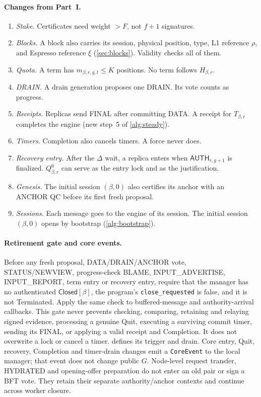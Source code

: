 \documentclass[11pt,a4paper]{article}
\newcommand{\tagg}[1]{\ensuremath{\mathsf{#1}}}
\begin{document}
\paragraph{Changes from Part~I.}
\begin{enumerate}[label=\arabic*.]
\item \emph{Stake.} Certificates need weight $>F$, not $f+1$ signatures.
\item \emph{Blocks.} A block also carries its session, physical
position, type, L1 reference $\rho$, and Espresso reference $\xi$
(\cref{sec:blocks}). Validity
checks all of them.
\item \emph{Quota.} A term has $m_{\beta,r,g,t}\le K$ positions. No term follows
$H_{\beta,r}$.
\item \emph{DRAIN.} A drain generation proposes one DRAIN. Its vote
counts as progress.
\item \emph{Receipts.} Replicas send FINAL after committing DATA. A
receipt for $T_{\beta,r}$ completes the engine (new step~5 of \cref{alg:steady}).
\item \emph{Timers.} Completion also cancels timers. A force never does.
\item \emph{Recovery entry.} After the $\Delta$ wait, a replica enters
when $\tagg{AUTH}_{r,g+1}$ is finalized. $Q_{\beta,r}^0$ can serve as the entry
lock and as the justification.
\item \emph{Genesis.} The initial session $(\beta,0)$ also certifies its anchor with an
ANCHOR QC before its first fresh proposal.
\item \emph{Sessions.} Each message goes to the engine of its session.
The initial session $(\beta,0)$ opens by bootstrap (\cref{alg:bootstrap}).
\end{enumerate}

\paragraph{Retirement gate and core events.}
Before any fresh proposal, DATA/DRAIN/ANCHOR vote, STATUS/NEWVIEW,
progress-check BLAME, INPUT\_ADVERTISE, INPUT\_REPORT, term entry or recovery entry, require that
the manager has no authenticated $\tagg{Closed}[\beta]$, the program's
\texttt{close\_requested} is false, and it is not Terminated.
Apply the same check to buffered-message and authority-arrival callbacks.
This gate never prevents checking, comparing, retaining and relaying
signed evidence, processing a genuine Quit, executing a surviving commit
timer, sending its FINAL, or applying a valid receipt and Completion.
It does not overwrite a lock or cancel a timer. 
defines its trigger and drain. Core entry, Quit, recovery, Completion
and timer-drain changes emit a \texttt{CoreEvent} to the local manager;
that event does not change public $G$.
Node-level request transfer, HYDRATED and opening-offer preparation do
not enter an old pair or sign a BFT vote. They retain their separate
authority/anchor contexts and continue across worker closure.
\end{document}
